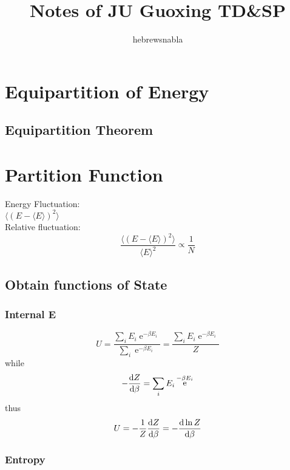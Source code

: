 \documentclass[UTF8]{ctexart} %
\title{Notes of JU Guoxing TD\&SP}
\author{hebrewsnabla}
\DeclareMathOperator{\e}{\mathrm{e}}
\numberwithin{equation}{subsection}
\begin{document}
\maketitle
\setcounter{section}{18}
\section{Equipartition of Energy}
\subsection{Equipartition Theorem}

\section{Partition Function}
Energy Fluctuation:\\
$ \langle(E - \langle E\rangle)^2\rangle $\\
Relative fluctuation:\\
\begin{equation}\label{key}
\dfrac{\langle(E - \langle E\rangle)^2\rangle}{\langle E\rangle^2} \propto \dfrac{1}{N}
\end{equation}
\subsection{}
\subsection{Obtain functions of State}
\subsubsection{Internal E}
\begin{equation}\label{key}
U = \dfrac{\sum_i E_i \e^{-\beta E_i}}{\sum_i \e^{-\beta E_i}} = \dfrac{\sum_i E_i \e^{-\beta E_i}}{Z}
\end{equation}
while
\begin{equation}\label{key}
-\dv{Z}{\beta} = \sum_i E_i \e^{-\beta E_i}
\end{equation}
thus
\begin{equation}\label{key}
U = -\dfrac{1}{Z}\dv{Z}{\beta} = -\dv{\ln Z}{\beta}
\end{equation}
\subsubsection{Entropy}
\end{document}
